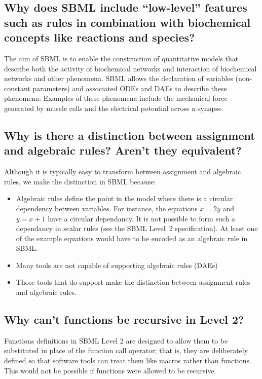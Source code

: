 \documentclass{sbmlfaq}
\begin{document}
\subsection{Why does SBML include ``low-level'' features such as rules in
  combination with biochemical concepts like reactions and species?} 

The aim of SBML is to enable the construction of quantitative models that
describe both the activity of biochemical networks and interaction of
biochemical networks and other phenomena.  SBML allows the declaration of
variables (non-constant parameters) and associated ODEs and DAEs to
describe these phenomena.  Examples of these phenomena include the
mechanical force generated by muscle cells and the electrical potential
across a synapse.

\subsection{Why is there a distinction between assignment and algebraic rules?
  Aren't they equivalent?}

Although it is typically easy to transform between assignment and algebraic
rules, we make the distinction in SBML because:
\begin{itemize}

\item Algebraic rules define the point in the model where there is a circular
  dependency between variables.  For instance, the equations $x = 2y$ and $y = x + 1$
  have a circular dependancy.  It is not possible to form such a dependancy in
  scalar rules (see the SBML Level~2 specification).  At least one of the example
  equations would have to be encoded as an algebraic rule in SBML.
  
\item Many tools are not capable of supporting algebraic rules (DAEs)
  
\item Those tools that do support make the distinction between assignment rules
  and algebraic rules.

\end{itemize}


\subsection{Why can't functions be recursive in Level 2?}

Functions definitions in SBML Level 2 are designed to allow them to be
substituted in place of the function call operator; that is, they are
deliberately defined so that software tools can treat them like macros
rather than functions.  This would not be possible if functions were
allowed to be recursive.
\end{document}
